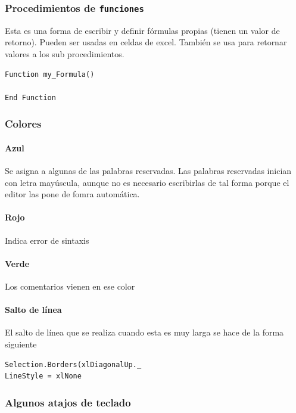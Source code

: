 \subsubsection{Procedimientos de \texttt{funciones}}

Esta es una forma de escribir y definir fórmulas propias (tienen un valor de retorno). Pueden ser usadas en celdas de excel. También se usa para retornar valores a los sub procedimientos.

\begin{verbatim}
Function my_Formula()

End Function
\end{verbatim}

\subsubsection{Colores}

\paragraph{Azul} Se asigna a algunas de las palabras reservadas. Las palabras reservadas inician con letra mayúscula, aunque no es necesario escribirlas de tal forma porque el editor las pone de fomra automática.

\paragraph{Rojo} Indica error de sintaxis


\paragraph{Verde} Los comentarios vienen en ese color

\paragraph{Salto de línea} El salto de línea que se realiza cuando esta es muy larga se hace de la forma siguiente


\begin{verbatim}
Selection.Borders(xlDiagonalUp._
LineStyle = xlNone
\end{verbatim}


\subsubsection{Algunos atajos de teclado}

